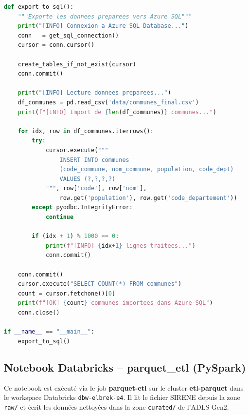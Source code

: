 \documentclass[12pt,a4paper]{article}
\begin{document}
\begin{lstlisting}[language=Python]
def export_to_sql():
    """Exporte les donnees preparees vers Azure SQL"""
    print("[INFO] Connexion a Azure SQL Database...")
    conn   = get_sql_connection()
    cursor = conn.cursor()

    create_tables_if_not_exist(cursor)
    conn.commit()

    print("[INFO] Lecture donnees preparees...")
    df_communes = pd.read_csv('data/communes_final.csv')
    print(f"[INFO] Import de {len(df_communes)} communes...")

    for idx, row in df_communes.iterrows():
        try:
            cursor.execute("""
                INSERT INTO communes
                (code_commune, nom_commune, population, code_dept)
                VALUES (?,?,?,?)
            """, row['code'], row['nom'],
                row.get('population'), row.get('code_departement'))
        except pyodbc.IntegrityError:
            continue

        if (idx + 1) % 1000 == 0:
            print(f"[INFO] {idx+1} lignes traitees...")
            conn.commit()

    conn.commit()
    cursor.execute("SELECT COUNT(*) FROM communes")
    count = cursor.fetchone()[0]
    print(f"[OK] {count} communes importees dans Azure SQL")
    conn.close()

if __name__ == "__main__":
    export_to_sql()
\end{lstlisting}

\subsection{Notebook Databricks -- parquet\_etl (PySpark)}
\label{annexe:parquet_etl}

Ce notebook est exécuté via le job \textbf{parquet-etl} sur le cluster \textbf{etl-parquet} dans le workspace Databricks \texttt{dbw-elbrek-e4}. Il lit le fichier SIRENE depuis la zone \texttt{raw/} et écrit les données nettoyées dans la zone \texttt{curated/} de l'ADLS Gen2.
\end{document}
